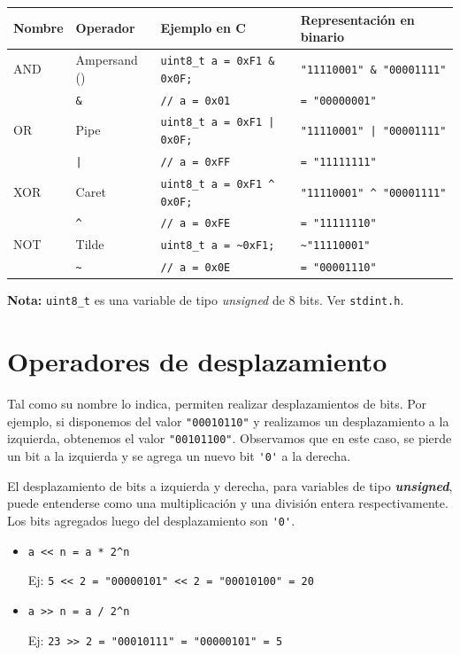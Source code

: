 \documentclass[paper=a4, fontsize=11pt]{scrartcl}	%
\numberwithin{equation}{section} %
\numberwithin{figure}{section} %
\numberwithin{table}{section} %
\begin{document}
\begin{table}[h]
  \centering
  \small
  \begin{tabular}{l | l | l | l}
    \hline
    \textbf{Nombre} & \textbf{Operador} & \textbf{Ejemplo en C} & \textbf{Representación en binario} \\ \hline
    AND & Ampersand () & \verb!uint8_t a = 0xF1 & 0x0F;! & \verb!"11110001" & "00001111"! \\
    & \verb!&! & \verb!// a = 0x01! & \verb!= "00000001"! \\ \hline
    OR & Pipe & \verb!uint8_t a = 0xF1 | 0x0F;! & \verb!"11110001" | "00001111"!  \\
    & \verb!|! & \verb!// a = 0xFF! & \verb!= "11111111"! \\ \hline
    XOR & Caret & \verb!uint8_t a = 0xF1 ^ 0x0F;!  & \verb!"11110001" ^ "00001111"!  \\
    & \verb!^! & \verb!// a = 0xFE! & \verb!= "11111110"! \\ \hline
    NOT  & Tilde & \verb!uint8_t a = ~0xF1;! & \verb!~"11110001"! \\
    & \verb!~! & \verb!// a = 0x0E! & \verb!= "00001110"! \\ \hline
  \end{tabular}
\end{table}
\textbf{Nota:} \verb|uint8_t| es una variable de tipo \emph{unsigned} de
8 bits. Ver \verb|stdint.h|.

\section{Operadores de desplazamiento}

Tal como su nombre lo indica, permiten realizar desplazamientos de bits.
Por ejemplo, si disponemos del valor \verb|"00010110"| y realizamos un
desplazamiento a la izquierda, obtenemos el valor \verb|"00101100"|. Observamos
que en este caso, se {pierde} un bit a la izquierda y se
{agrega} un nuevo bit \verb|'0'| a la derecha.

El desplazamiento de bits a izquierda y derecha, para variables de tipo
\textbf{\emph{unsigned}}, puede entenderse como una multiplicación y una división entera
respectivamente. Los bits agregados luego del desplazamiento son
\verb!'0'!.

\begin{itemize}
  \item \verb!a << n = a * 2^n!

    Ej: \verb!5 << 2 = "00000101" << 2 = "00010100" = 20!

  \item \verb!a >> n = a / 2^n!

    Ej: \verb!23 >> 2 = "00010111" = "00000101" = 5!
\end{itemize}
\end{document}
